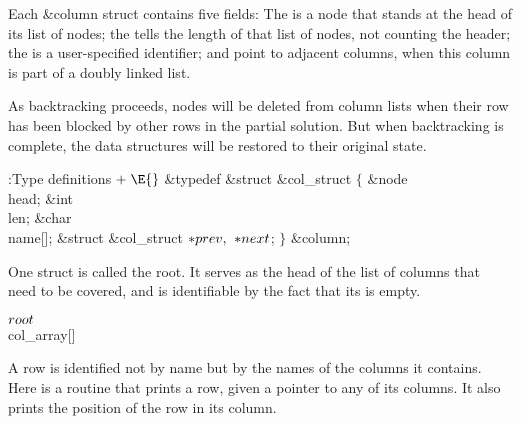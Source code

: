Each \&{column} struct contains five fields:
The  is a node that stands at the head of its list of nodes;
the  tells the length of that list of nodes, not counting the
header;
the  is a user-specified identifier;
 and  point to adjacent columns, when this
column is part of a doubly linked list.

As backtracking proceeds, nodes
will be deleted from column lists when their row has been blocked by
other rows in the partial solution.
But when backtracking is complete, the data structures will be
restored to their original state.

\Y\B\4:Type definitions\X${}\mathrel+\E{}$\6
\&{typedef} \&{struct} \&{col\_struct} ${}\{{}$\1\6
\&{node} \\{head};\6
\&{int} \\{len};\6
\&{char} \\{name}[];\6
\&{struct} \&{col\_struct} ${}{*}\\{prev},{}$ ${}{*}\\{next}{}$;\2\6
${}\}{}$ \&{column};\par
\fi

One  struct is called the root. It serves as
the head of the
list of columns that need to be covered, and is identifiable by the fact
that its  is empty.

\Y\B\4\D$\\{root}$ \5
\\{col\_array}[]\par
\fi

A row is identified not by name but by the names of the
columns it contains.
Here is a routine that prints a row, given a pointer to any of its
columns. It also prints the position of the row in its column.

